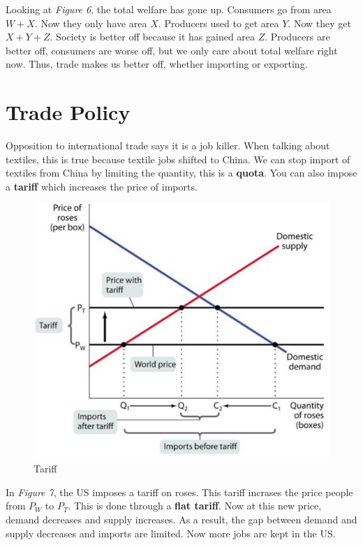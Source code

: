 \documentclass{article}
\begin{document}
Looking at \textit{Figure 6}, the total welfare has gone up. Consumers go from
area $W+X$. Now they only have area $X$. Producers used to get area $Y$. Now
they get $X+Y+Z$. Society is better off because it has gained area $Z$.
Producers are better off, consumers are worse off, but we only care about total
welfare right now. Thus, trade makes us better off, whether importing or
exporting.

\section{Trade Policy}

Opposition to international trade says it is a job killer. When talking about
textiles, this is true because textile jobs shifted to China. We can stop import
of textiles from China by limiting the quantity, this is a \textbf{quota}. You
can also impose a \textbf{tariff} which increases the price of imports.

\begin{figure}[H]
    \centering
    \includegraphics[scale=0.9]{"Figure 7"}
    \caption{Tariff}
\end{figure}

In \textit{Figure 7}, the US imposes a tariff on roses. This tariff incrases the
price people from $P_W$ to $P_T$. This is done through a \textbf{flat tariff}.
Now at this new price, demand decreases and supply increases. As a result, the
gap between demand and supply decreases and imports are limited. Now more jobs
are kept in the US. 
\end{document}
